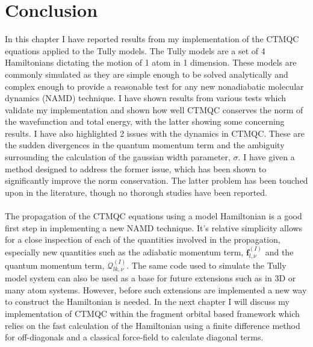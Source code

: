 \section{Conclusion}
In this chapter I have reported results from my implementation of the CTMQC equations applied to the Tully models. The Tully models are a set of 4 Hamiltonians dictating the motion of 1 atom in 1 dimension. These models are commonly simulated as they are simple enough to be solved analytically and complex enough to provide a reasonable test for any new nonadiabatic molecular dynamics (NAMD) technique. I have shown results from various tests which validate my implementation and shown how well CTMQC conserves the norm of the wavefunction and total energy, with the latter showing some concerning results. I have also highlighted 2 issues with the dynamics in CTMQC. These are the sudden divergences in the quantum momentum term and the ambiguity surrounding the calculation of the gaussian width parameter, $\sigma$. I have given a method designed to address the former issue, which has been shown to significantly improve the norm conservation. The latter problem has been touched upon in the literature, though no thorough studies have been reported.
\\\\
The propagation of the CTMQC equations using a model Hamiltonian is a good first step in implementing a new NAMD technique. It's relative simplicity allows for a close inspection of each of the quantities involved in the propagation, especially new quantities such as the adiabatic momentum term, $\mathbf{f}_{l, \nu}^{(I)}$ and the quantum momentum term, $\mathcal{Q}_{lk, \nu}^{(I)}$. The same code used to simulate the Tully model system can also be used as a base for future extensions such as in 3D or many atom systems. However, before such extensions are implemented a new way to construct the Hamiltonian is needed. In the next chapter I will discuss my implementation of CTMQC within the fragment orbital based framework which relies on the fast calculation of the Hamiltonian using a finite difference method for off-diagonals and a classical force-field to calculate diagonal terms. 



